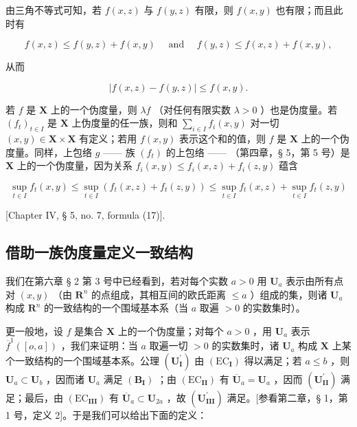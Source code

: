 由三角不等式可知，若 \(f(x, z)\) 与 \(f(y, z)\) 有限，则 \(f(x, y)\) 也有限；而且此时有

\[
f (x, z) \leqslant f (y, z) + f (x, y) \quad \text { and } \quad f (y, z) \leqslant f (x, z) + f (x, y),
\]

从而

\[
\left| f (x, z) - f (y, z) \right| \leqslant f (x, y).\tag{1}
\]

若 \(f\) 是 \(\mathbf{X}\) 上的一个伪度量，则 \(\lambda f\) （对任何有限实数 \(\lambda > 0\) ）也是伪度量。若 \((f_t)_{t \in I}\) 是 \(\mathbf{X}\) 上伪度量的任一族，则和 \(\sum_{i \in I} f_i(x, y)\) 对一切 \((x, y) \in \mathbf{X} \times \mathbf{X}\) 有定义；若用 \(f(x, y)\) 表示这个和的值，则 \(f\) 是 \(\mathbf{X}\) 上的一个伪度量。同样，上包络 \(g\) —— 族 \((f_t)\) 的上包络 —— （第四章，§ 5，第 5 号）是 \(\mathbf{X}\) 上的一个伪度量，因为关系 \(f_i(x, y) \leqslant f_i(x, z) + f_i(z, y)\) 蕴含

\[
\sup _ {t \in I} f _ {t} (x, y) \leqslant \sup _ {t \in I} \left(f _ {t} (x, z) + f _ {t} (z, y)\right) \leqslant \sup _ {t \in I} f _ {t} (x, z) + \sup _ {t \in I} f _ {t} (z, y)
\]

{[}Chapter IV, § 5, no. 7, formula (17){]}.

\subsection{借助一族伪度量定义一致结构}

我们在第六章 § 2 第 3 号中已经看到，若对每个实数 \(a > 0\) 用 \(\mathbf{U}_a\) 表示由所有点对 \((x, y)\) （由 \(\mathbf{R}^n\) 的点组成，其相互间的欧氏距离 \(\leqslant a\) ）组成的集，则诸 \(\mathbf{U}_a\) 构成 \(\mathbf{R}^n\) 的一致结构的一个围域基本系（当 \(a\) 取遍 \(> 0\) 的实数集时）。

更一般地，设 \(f\) 是集合 \(\mathbf{X}\) 上的一个伪度量；对每个 \(a > 0\) ，用 \(\mathbf{U}_a\) 表示 \(\overline{f}^{1}([o, a])\) ，我们来证明：当 \(a\) 取遍一切 \(> 0\) 的实数集时，诸 \(\mathbf{U}_a\) 构成 \(\mathbf{X}\) 上某个一致结构的一个围域基本系。公理 \((\mathbf{U}_{\mathbf{I}}^{\prime})\) 由 \((\mathrm{EC}_{\mathbf{I}})\) 得以满足；若 \(a \leqslant b\) ，则 \(\mathbf{U}_a \subset \mathbf{U}_b\) ，因而诸 \(\mathbf{U}_a\) 满足 \((\mathbf{B}_{\mathbf{I}})\) ；由 \((\mathrm{EC}_{\mathbf{II}})\) 有 \(\overline{\mathbf{U}}_a = \mathbf{U}_a\) ，因而 \((\mathbf{U}_{\mathbf{II}}^{\prime})\) 满足；最后，由 \((\mathrm{EC}_{\mathbf{III}})\) 有 \(\overline{\mathbf{U}}_a \subset \mathbf{U}_{2a}\) ，故 \((\mathbf{U}_{\mathbf{III}}^{\prime})\) 满足。{[}参看第二章，§ 1，第 1 号，定义 2{]}。于是我们可以给出下面的定义：

